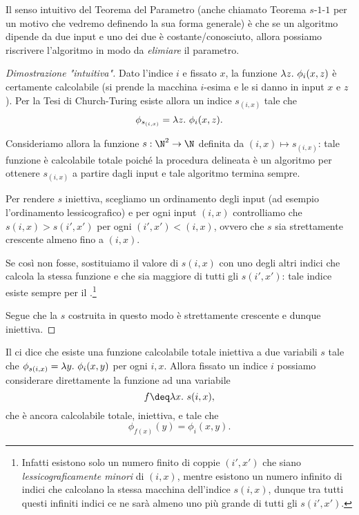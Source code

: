 Il senso intuitivo del Teorema del Parametro (anche chiamato Teorema $s$-$1$-$1$ per un motivo che vedremo definendo la sua forma generale) è che se un algoritmo dipende da due input e uno dei due è costante/conosciuto, allora possiamo riscrivere l'algoritmo in modo da \emph{elimiare} il parametro.

\begin{proof}
    [Dimostrazione "intuitiva"]
    Dato l'indice $i$ e fissato $x$, la funzione $\lambda{z}.\ {\phi_i(x, z)}$ è certamente calcolabile (si prende la macchina $i$-esima e le si danno in input $x$ e $z$). Per la Tesi di Church-Turing esiste allora un indice $s_{(i, x)}$ tale che \[
        \phi_{s_{(i, x)}} = \lambda{z}.\ {\phi_i(x, z)}.
    \] 

    Consideriamo allora la funzione $s : \N^2 \to \N$ definita da $(i, x) \mapsto s_{(i, x)}$: tale funzione è calcolabile totale poiché la procedura delineata è un algoritmo per ottenere $s_{(i, x)}$ a partire dagli input e tale algoritmo termina sempre.

    Per rendere $s$ iniettiva, scegliamo un ordinamento degli input (ad esempio l'ordinamento lessicografico) e per ogni input $(i, x)$ controlliamo che $s(i, x) > s(i', x')$ per ogni $(i', x') < (i, x)$, ovvero che $s$ sia strettamente crescente almeno fino a $(i, x)$.
    
    Se così non fosse, sostituiamo il valore di $s(i, x)$ con uno degli altri indici che calcola la stessa funzione e che sia maggiore di tutti gli $s(i', x')$: tale indice esiste sempre per il .\footnote{Infatti esistono solo un numero finito di coppie $(i', x')$ che siano \emph{lessicograficamente minori} di $(i, x)$, mentre esistono un numero infinito di indici che calcolano la stessa macchina dell'indice $s(i, x)$, dunque tra tutti questi infiniti indici ce ne sarà almeno uno più grande di tutti gli $s(i', x')$.}
    
    Segue che la $s$ costruita in questo modo è strettamente crescente e dunque iniettiva.
\end{proof}

\begin{remark}\label{rem:s-1-1-one-var}
    Il  ci dice che esiste una funzione calcolabile totale iniettiva a due variabili $s$ tale che $\phi_{s(i, x)} = \lambda{y}.\ {\phi_i(x, y)}$ per ogni $i, x$. Allora fissato un indice $i$ possiamo considerare direttamente la funzione ad una variabile \[
        f \deq \lam{x}{s(i, x)},
    \] che è ancora calcolabile totale, iniettiva, e tale che \[
        \phi_{f(x)}(y) = \phi_i(x, y).
    \]
\end{remark}

